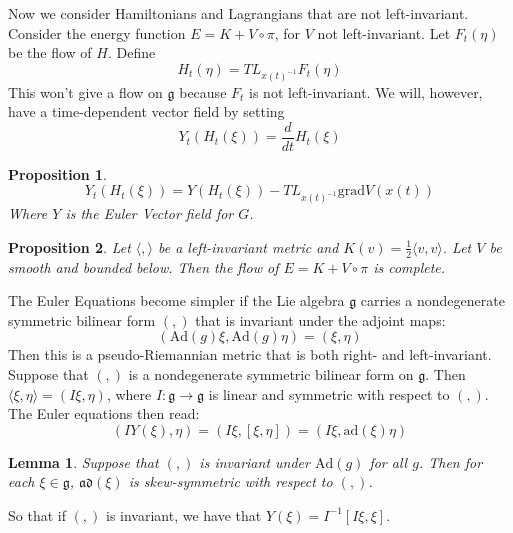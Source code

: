 \documentclass{article}
\newtheorem{prop}{Proposition}
\newtheorem{lem}{Lemma}
\begin{document}
Now we consider Hamiltonians and Lagrangians that are not left-invariant. Consider the energy function $E=K+V \circ \pi$, for $V$ not left-invariant. Let $F_t(\eta)$ be the flow of $H$. Define 
\begin{equation}H_t(\eta) = TL_{x(t)^{-1}} F_t(\eta)\end{equation}
This won't give a flow on $\mathfrak{g}$ because $F_t$ is not left-invariant. We will, however, have a time-dependent vector field by setting
\begin{equation}Y_t(H_t(\xi)) = \frac{d}{dt}H_t(\xi)\end{equation}

\begin{prop}
\begin{equation}Y_t(H_t(\xi)) = Y(H_t(\xi))-TL_{x(t)^{-1}} \mathrm{grad} V(x(t))\end{equation}
Where $Y$ is the Euler Vector field for $G$.
\end{prop}

\begin{prop}
Let $\langle, \rangle$ be a left-invariant metric and $K(v)=\frac{1}{2}\langle v, v \rangle$. Let $V$ be smooth and bounded below. Then the flow of $E=K+V \circ \pi$ is complete.
\end{prop}

The Euler Equations become simpler if the Lie algebra $\mathfrak{g}$ carries a nondegenerate symmetric bilinear form $(,)$ that is invariant under the adjoint maps:
\begin{equation}(\mathrm{Ad}(g) \xi, \mathrm{Ad}(g) \eta) = (\xi, \eta)\end{equation}
Then this is a pseudo-Riemannian metric that is both right- and left-invariant. \\
\indent Suppose that $(,)$ is a nondegenerate symmetric bilinear form on $\mathfrak{g}$. Then $\langle \xi, \eta \rangle = (I\xi,\eta)$, where $I:\mathfrak{g} \to \mathfrak{g}$ is linear and symmetric with respect to $(,)$. The Euler equations then read:
\begin{equation}(IY(\xi),\eta)=(I\xi, [\xi,\eta])=(I\xi, \mathrm{ad}(\xi)\eta)\end{equation}

\begin{lem}
Suppose that $(,)$ is invariant under $\mathrm{Ad}(g)$ for all $g$. Then for each $\xi \in \mathfrak{g}$, $\mathfrak{ad}(\xi)$ is skew-symmetric with respect to $(,)$.
\end{lem}
So that if $(,)$ is invariant, we have that $Y(\xi) = I^{-1}[I\xi,\xi]$.
\end{document}

